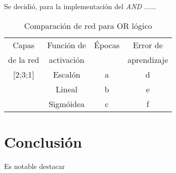 \documentclass[%
    final,
    reprint,
    notitlepage,
    narroweqnarray,
    inline,
    twoside,
    invited
    ]{ieee}
\begin{document}
\par Se decidió, para la implementación del \textit{AND} ......

\begin{table}[H]
\begin{center}
\begin{tabular}{|c|c|c|c|}
\hline
  Capas & Función de &  Épocas & Error de\\
 de la red & activación &  & aprendizaje\\

\hline
\hline

[2;3;1] & Escalón & a & d\\
\hline
[2;3;1] & Lineal & b & e\\
\hline
[2;3;1] & Sigmóidea & c & f\\
\hline

\end{tabular}
\end{center}
\caption{Comparación de red para OR lógico}\label{tablaIDFS}
\end{table}

\section{Conclusión}

\PARstart Es notable destacar 

%
%
%
%
%


\end{document}
